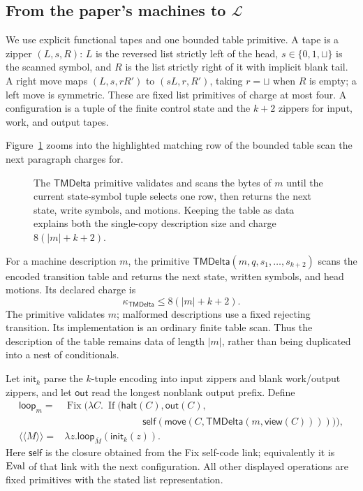 \subsection{From the paper's machines to
\texorpdfstring{\(\mathcal L\)}{L}}

We use explicit functional tapes and one bounded table primitive.  A tape is a
zipper \((L,s,R)\): \(L\) is the reversed list strictly left of the head,
\(s\in\{0,1,\sqcup\}\) is the scanned symbol, and \(R\) is the list strictly
right of it with implicit blank tail.  A right move maps
\((L,s,rR')\) to \((sL,r,R')\), taking \(r=\sqcup\) when \(R\) is empty; a
left move is symmetric.  These are fixed list primitives of charge at most
four.  A configuration is a tuple of the finite control state and the
\(k+2\) zippers for input, work, and output tapes.

Figure~\ref{fig:C-tmdelta-scan} zooms into the highlighted matching row of the
bounded table scan the next paragraph charges for.
\begin{figure}[H]
\centering

\caption{The \(\mathsf{TMDelta}\) primitive validates and scans the bytes of \(m\) until the current state-symbol tuple selects one row, then returns the next state, write symbols, and motions.  Keeping the table as data explains both the single-copy description size and charge \(8(|m|+k+2)\).}
\label{fig:C-tmdelta-scan}
\end{figure}

For a machine description \(m\), the primitive
\(\mathsf{TMDelta}(m,q,s_1,\ldots,s_{k+2})\) scans the encoded transition table
and returns the next state, written symbols, and head motions.  Its declared
charge is
\[
 \kappa_{\mathsf{TMDelta}}\leq 8(|m|+k+2).
\]
The primitive validates \(m\); malformed descriptions use a fixed rejecting
transition.  Its implementation is an ordinary finite table scan.  Thus the
description of the table remains data of length \(|m|\), rather than being
duplicated into a nest of conditionals.

Let \(\mathsf{init}_k\) parse the \(k\)-tuple encoding into input zippers and
blank work/output zippers, and let \(\mathsf{out}\) read the longest nonblank
output prefix.  Define
\[
\begin{split}
 \mathsf{loop}_m={}&\operatorname{Fix}\bigl(
  \lambda C.\ \operatorname{If}(\mathsf{halt}(C),\mathsf{out}(C),\\[-2pt]
 &\hspace{8em}\mathsf{self}(\mathsf{move}(
       C,\mathsf{TMDelta}(m,\mathsf{view}(C)))))\bigr),\\
 \langle\!\langle M\rangle\!\rangle={}&\lambda z.\mathsf{loop}_{\overline M}
                  (\mathsf{init}_k(z)).
\end{split}
\tag{9.1}\label{eq:tm-interpreter-term}
\]
Here \(\mathsf{self}\) is the closure obtained from the Fix self-code link;
equivalently it is \(\operatorname{Eval}\) of that link with the next configuration.  All
other displayed operations are fixed primitives with the stated list
representation.

